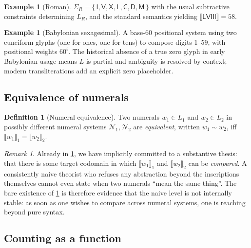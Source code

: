 \documentclass[12pt]{article}
\theoremstyle{definition}
\newtheorem{definition}[theorem]{Definition}
\newtheorem{example}[theorem]{Example}
\theoremstyle{remark}
\newtheorem{remark}[theorem]{Remark}
\begin{document}
\begin{example}[Roman]
\label{ex:roman}
$\Sigma_R = \{\,\textsf{I}, \textsf{V}, \textsf{X}, \textsf{L},
\textsf{C}, \textsf{D}, \textsf{M}\,\}$ with the usual subtractive
constraints determining $L_R$, and the standard semantics yielding
$\llbracket \textsf{LVIII}\rrbracket = 58$.
\end{example}

\begin{example}[Babylonian sexagesimal]
\label{ex:babylonian}
A base-60 positional system using two cuneiform glyphs (one for ones, one
for tens) to compose digits 1--59, with positional weights $60^i$. The
historical absence of a true zero glyph in early Babylonian usage means
$L$ is partial and ambiguity is resolved by context; modern transliterations
add an explicit zero placeholder.
\end{example}

\subsection{Equivalence of numerals}

\begin{definition}[Numeral equivalence]
\label{def:numeral-equivalence}
Two numerals $w_1 \in L_1$ and $w_2 \in L_2$ in possibly different numeral
systems $\mathcal{N}_1, \mathcal{N}_2$ are \emph{equivalent}, written
$w_1 \sim w_2$, iff $\llbracket w_1 \rrbracket_1 = \llbracket w_2
\rrbracket_2$.
\end{definition}

\begin{remark}
\label{rem:symbol-vs-number}
Already in \cref{def:numeral-equivalence}, we have implicitly committed to
a substantive thesis: that there is some target codomain in which
$\llbracket w_1 \rrbracket_1$ and $\llbracket w_2 \rrbracket_2$ can be
\emph{compared}. A consistently naive theorist who refuses any abstraction
beyond the inscriptions themselves cannot even state when two numerals
``mean the same thing''. The bare existence of \cref{def:numeral-equivalence}
is therefore evidence that the naive level is not internally stable: as
soon as one wishes to compare across numeral systems, one is reaching
beyond pure syntax.
\end{remark}

\subsection{Counting as a function}
\end{document}
